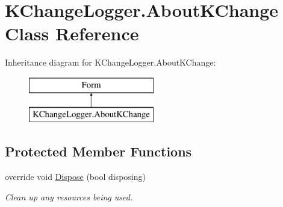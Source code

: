 \hypertarget{class_k_change_logger_1_1_about_k_change}{\section{K\-Change\-Logger.\-About\-K\-Change Class Reference}
\label{class_k_change_logger_1_1_about_k_change}
}
Inheritance diagram for K\-Change\-Logger.\-About\-K\-Change\-:\begin{figure}[H]
\begin{center}
\leavevmode
\includegraphics[height=2.000000cm]{class_k_change_logger_1_1_about_k_change}
\end{center}
\end{figure}
\subsection*{Protected Member Functions}
\begin{DoxyCompactItemize}
\item 
override void \hyperlink{class_k_change_logger_1_1_about_k_change_aac5e742892a7a59cd6b7572ecb3ead10}{Dispose} (bool disposing)
\begin{DoxyCompactList}\small\item\em Clean up any resources being used. \end{DoxyCompactList}\end{DoxyCompactItemize}
